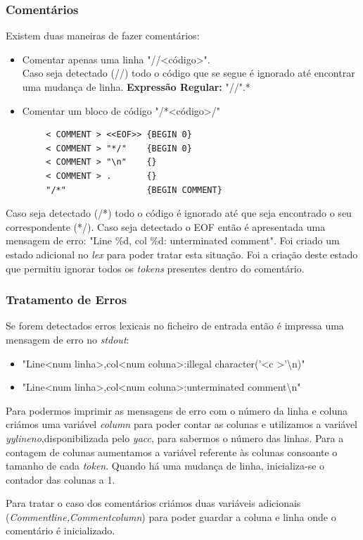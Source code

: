 \documentclass[12pt]{article}
\begin{document}
		\subsubsection{Comentários}
		Existem duas maneiras de fazer comentários:
		\begin{itemize}
			\item Comentar apenas uma linha "//\textless código\textgreater". \\Caso seja detectado (//)  todo o código que se segue é ignorado até encontrar uma mudança de linha.
			\subitem \textbf{Expressão Regular:} "//".*
			\item Comentar um bloco de código  "/*\textless código\textgreater */"
		\end{itemize} 
		\begin{lstlisting}
		< COMMENT > <<EOF>> {BEGIN 0}
		< COMMENT > "*/"    {BEGIN 0}
		< COMMENT > "\n"    {}
		< COMMENT > .       {}
		"/*"	            {BEGIN COMMENT}
		\end{lstlisting}
		Caso seja detectado (/*) todo o código é ignorado até que seja encontrado o seu correspondente (*/). Caso seja detectado o EOF então é apresentada uma mensagem de erro: "Line \%d, col \%d: unterminated comment". Foi criado um estado adicional no \emph{lex} para poder tratar esta situação. Foi a criação deste estado que permitiu ignorar todos os \emph{tokens} presentes dentro do comentário.
		
		
		
		\subsubsection{Tratamento de Erros}
		Se forem detectados erros lexicais no ficheiro de entrada então é impressa uma mensagem de erro no \emph{stdout}:
		\begin{itemize}
            \item "Line\textless num linha\textgreater,col\textless num coluna\textgreater:illegal character('\textless c \textgreater'\textbackslash n)"
            \item "Line\textless num linha\textgreater,col\textless num coluna\textgreater:unterminated comment\textbackslash n"
        \end{itemize}
        \par Para podermos imprimir as mensagens de erro com o número da linha e coluna criámos uma variável \emph{column} para poder contar as colunas e utilizamos a variável \emph{yylineno},disponibilizada pelo \emph{yacc}, para sabermos o número das linhas.
        Para a contagem de colunas aumentamos a variável referente às colunas consoante o tamanho de cada \emph{token}. Quando há uma mudança de linha, inicializa-se o contador das colunas a 1. 
        \par Para tratar o caso dos comentários criámos duas variáveis adicionais (\emph{Commentline,Commentcolumn}) para poder guardar a coluna e linha onde o comentário é inicializado.
        
\end{document}
